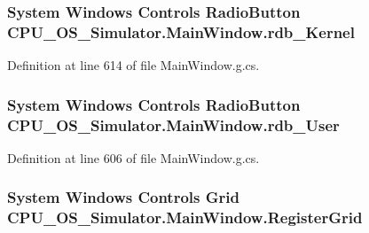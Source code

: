 \subsubsection[{rdb\+\_\+\+Kernel}]{\setlength{\rightskip}{0pt plus 5cm}System Windows Controls Radio\+Button C\+P\+U\+\_\+\+O\+S\+\_\+\+Simulator.\+Main\+Window.\+rdb\+\_\+\+Kernel\hspace{0.3cm}{\ttfamily [package]}}\label{class_c_p_u___o_s___simulator_1_1_main_window_a549c6be690b051f4ab15dce643dec656}


Definition at line 614 of file Main\+Window.\+g.\+cs.

\hypertarget{class_c_p_u___o_s___simulator_1_1_main_window_ab9e8d52c337bc24a24d8282dfbf449c8}{}
\subsubsection[{rdb\+\_\+\+User}]{\setlength{\rightskip}{0pt plus 5cm}System Windows Controls Radio\+Button C\+P\+U\+\_\+\+O\+S\+\_\+\+Simulator.\+Main\+Window.\+rdb\+\_\+\+User\hspace{0.3cm}{\ttfamily [package]}}\label{class_c_p_u___o_s___simulator_1_1_main_window_ab9e8d52c337bc24a24d8282dfbf449c8}


Definition at line 606 of file Main\+Window.\+g.\+cs.

\hypertarget{class_c_p_u___o_s___simulator_1_1_main_window_a37acb139db0aa54950350fdb47dfd452}{}
\subsubsection[{Register\+Grid}]{\setlength{\rightskip}{0pt plus 5cm}System Windows Controls Grid C\+P\+U\+\_\+\+O\+S\+\_\+\+Simulator.\+Main\+Window.\+Register\+Grid\hspace{0.3cm}{\ttfamily [package]}}\label{class_c_p_u___o_s___simulator_1_1_main_window_a37acb139db0aa54950350fdb47dfd452}


